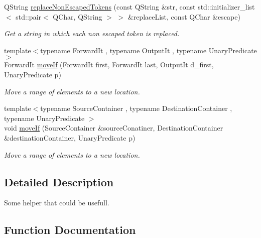 \begin{DoxyCompactItemize}
Q\+String \hyperlink{namespace_mdt_1_1_algorithm_a1b8c9cb581bf7a508e3bab5e91c60370}{replace\+Non\+Escaped\+Tokens} (const Q\+String \&str, const std\+::initializer\+\_\+list$<$ std\+::pair$<$ Q\+Char, Q\+String $>$ $>$ \&replace\+List, const Q\+Char \&escape)
\begin{DoxyCompactList}\small\item\em Get a string in which each non escaped token is replaced. \end{DoxyCompactList}\item 
{\footnotesize template$<$typename Forward\+It , typename Output\+It , typename Unary\+Predicate $>$ }\\Forward\+It \hyperlink{namespace_mdt_1_1_algorithm_a1f739be25cc7de2c30a21b85d9b25f0a}{move\+If} (Forward\+It first, Forward\+It last, Output\+It d\+\_\+first, Unary\+Predicate p)
\begin{DoxyCompactList}\small\item\em Move a range of elements to a new location. \end{DoxyCompactList}\item 
{\footnotesize template$<$typename Source\+Container , typename Destination\+Container , typename Unary\+Predicate $>$ }\\void \hyperlink{namespace_mdt_1_1_algorithm_a89aa15ad38ca6c49c884319b9585f1f8}{move\+If} (Source\+Container \&source\+Conatiner, Destination\+Container \&destination\+Container, Unary\+Predicate p)
\begin{DoxyCompactList}\small\item\em Move a range of elements to a new location. \end{DoxyCompactList}\end{DoxyCompactItemize}


\subsection{Detailed Description}
Some helper that could be usefull. 

\subsection{Function Documentation}
